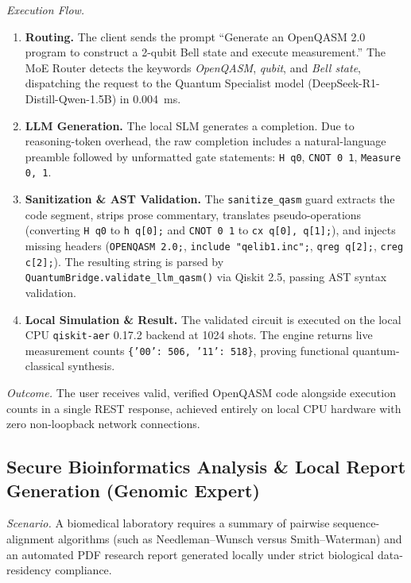 \documentclass[journal]{IEEEtran}
\begin{document}
\textit{Execution Flow.}
\begin{enumerate}
\item \textbf{Routing.} The client sends the prompt ``Generate an OpenQASM 2.0
program to construct a 2-qubit Bell state and execute measurement.'' The MoE
Router detects the keywords \emph{OpenQASM}, \emph{qubit}, and \emph{Bell state},
dispatching the request to the Quantum Specialist model
(DeepSeek-R1-Distill-Qwen-1.5B) in 0.004~ms.
\item \textbf{LLM Generation.} The local SLM generates a completion. Due to
reasoning-token overhead, the raw completion includes a natural-language
preamble followed by unformatted gate statements: \texttt{H q0},
\texttt{CNOT 0 1}, \texttt{Measure 0, 1}.
\item \textbf{Sanitization \& AST Validation.} The \texttt{sanitize\_qasm} guard
extracts the code segment, strips prose commentary, translates pseudo-operations
(converting \texttt{H q0} to \texttt{h q[0];} and \texttt{CNOT 0 1} to
\texttt{cx q[0], q[1];}), and injects missing headers (\texttt{OPENQASM 2.0;},
\texttt{include "qelib1.inc";}, \texttt{qreg q[2];}, \texttt{creg c[2];}). The
resulting string is parsed by \texttt{QuantumBridge.validate\_llm\_qasm()} via
Qiskit 2.5, passing AST syntax validation.
\item \textbf{Local Simulation \& Result.} The validated circuit is executed on
the local CPU \texttt{qiskit-aer} 0.17.2 backend at 1024 shots. The engine
returns live measurement counts \texttt{\{'00': 506, '11': 518\}}, proving
functional quantum-classical synthesis.
\end{enumerate}

\textit{Outcome.} The user receives valid, verified OpenQASM code alongside
execution counts in a single REST response, achieved entirely on local CPU
hardware with zero non-loopback network connections.

\subsection{Secure Bioinformatics Analysis \& Local Report Generation (Genomic Expert)}
\textit{Scenario.} A biomedical laboratory requires a summary of pairwise
sequence-alignment algorithms (such as Needleman--Wunsch versus
Smith--Waterman) and an automated PDF research report generated locally under
strict biological data-residency compliance.
\end{document}
